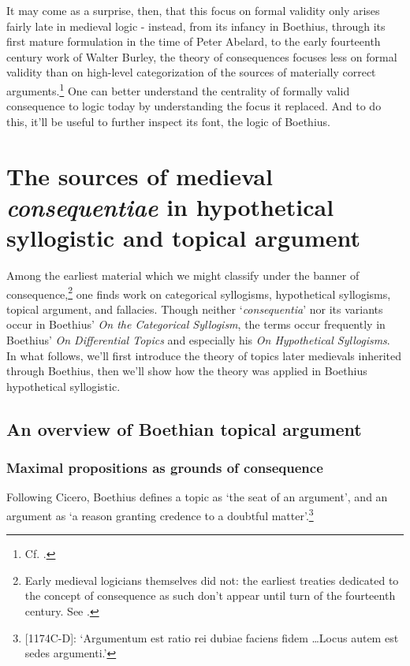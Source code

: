 \documentclass[a4paper, 11pt]{article}
\begin{document}
It may come as a surprise, then, that this focus on formal validity only arises fairly late in medieval logic - instead, from its infancy in Boethius, through its first mature formulation in the time of Peter Abelard, to the early fourteenth century work of Walter Burley, the theory of consequences focuses less on formal validity than on high-level categorization of the sources of materially correct arguments.\footnote{Cf.  \autocite{Martin2004,Martin2018,Archambault2018a}.} One can better understand the centrality of formally valid consequence to logic today by understanding the focus it replaced. And to do this, it'll be useful to further inspect its font, the logic of Boethius.

\section{The sources of medieval \emph{consequentiae} in hypothetical syllogistic and topical argument}
Among the earliest material which we might classify under the banner of consequence,\footnote{Early medieval logicians themselves did not: the earliest treaties dedicated to the concept of consequence as such don't appear until turn of the fourteenth century. See \autocite{Archambault2018a}.} one finds work on categorical syllogisms, hypothetical syllogisms, topical argument, and fallacies. Though neither `\emph{consequentia}' nor its variants occur in Boethius' \textit{On the Categorical Syllogism}, the terms occur frequently in Boethius' \emph{On Differential Topics} and especially his \emph{On Hypothetical Syllogisms}. In what follows, we'll first introduce the theory of topics later medievals inherited through Boethius, then we'll show how the theory was applied in Boethius hypothetical syllogistic.

\subsection{An overview of Boethian topical argument}
\subsubsection{Maximal propositions as grounds of consequence}
Following Cicero, Boethius defines a topic as `the seat of an argument', and an argument as `a reason granting credence to a doubtful matter'.\footnote{[1174C-D]\autocite{BDT}: `Argumentum est ratio rei dubiae faciens fidem \ldots Locus autem est sedes argumenti.'} 
\end{document}
